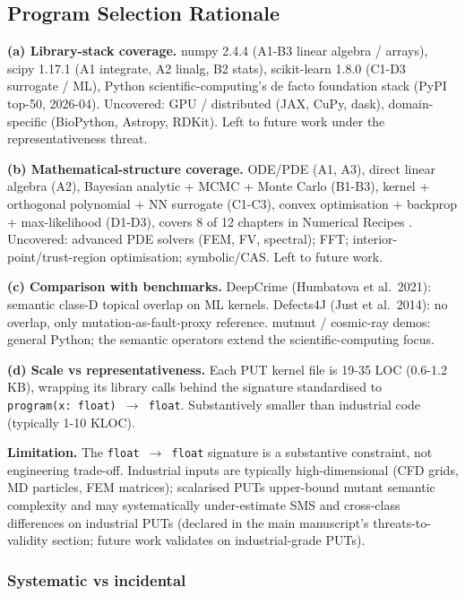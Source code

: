 \documentclass[manuscript,screen,review]{acmart}
\begin{document}
\subsection{Program Selection Rationale}\label{b.1-put-selection-rationale-detailed-coverage-argument}

\textbf{(a) Library-stack coverage.} numpy 2.4.4 (A1-B3 linear algebra /
arrays), scipy 1.17.1 (A1 integrate, A2 linalg, B2 stats), scikit-learn
1.8.0 (C1-D3 surrogate / ML), Python scientific-computing's de facto
foundation stack (PyPI top-50, 2026-04). Uncovered: GPU / distributed
(JAX, CuPy, dask), domain-specific (BioPython, Astropy, RDKit). Left to
future work under the representativeness threat.

\textbf{(b) Mathematical-structure coverage.} ODE/PDE (A1, A3), direct
linear algebra (A2), Bayesian analytic + MCMC + Monte Carlo (B1-B3),
kernel + orthogonal polynomial + NN surrogate (C1-C3), convex
optimisation + backprop + max-likelihood (D1-D3), covers 8 of 12
chapters in Numerical Recipes \citep{press2007numerical}. Uncovered: advanced
PDE solvers (FEM, FV, spectral); FFT; interior-point/trust-region
optimisation; symbolic/CAS. Left to future work.

\textbf{(c) Comparison with benchmarks.} DeepCrime (Humbatova et
al.~2021): semantic class-D topical overlap on ML kernels. Defects4J (Just et
al.~2014): no overlap, only mutation-as-fault-proxy reference. mutmut /
cosmic-ray demos: general Python; the semantic operators extend the scientific-computing focus.

\textbf{(d) Scale vs representativeness.} Each PUT kernel file is 19-35
LOC (0.6-1.2 KB), wrapping its library calls behind the signature
standardised to \texttt{program(x:\ float)\ $\to$\ float}. Substantively
smaller than industrial code (typically 1-10 KLOC).

\textbf{Limitation.} The \texttt{float\ $\to$\ float} signature is a
substantive constraint, not engineering trade-off. Industrial inputs are
typically high-dimensional (CFD grids, MD particles, FEM matrices);
scalarised PUTs upper-bound mutant semantic complexity and may
systematically under-estimate SMS and cross-class differences on
industrial PUTs (declared in the main manuscript's threats-to-validity section;
future work validates on industrial-grade PUTs).

\subsubsection{Systematic vs incidental}\label{b.1.5-systematic-vs-incidental}
\end{document}
